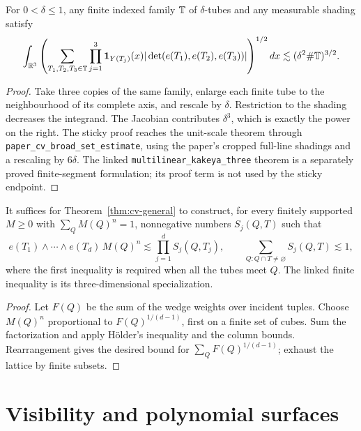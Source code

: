 \begin{theorem}
\label{thm:multilinear-kakeya}
\leanok
{}
For $0<\delta\leq1$, any finite indexed family $\mathbb{T}$ of
$\delta$-tubes and any measurable shading satisfy
\[
 \int_{\mathbb{R}^3}
  \left(\sum_{T_1,T_2,T_3\in\mathbb{T}}
    \prod_{j=1}^3\mathbf{1}_{Y(T_j)}(x)
    |\det(e(T_1),e(T_2),e(T_3))|\right)^{1/2}dx
       \lesssim (\delta^2\#\mathbb{T})^{3/2}.
\]
\end{theorem}
\begin{proof}
\leanok
Take three copies of the same family, enlarge each finite tube to
the neighbourhood of its complete axis, and rescale by $\delta$.
Restriction to the shading decreases the integrand. The Jacobian
contributes $\delta^3$, which is exactly the power on the right.
The sticky proof reaches the unit-scale theorem through
\texttt{paper\_cv\_broad\_set\_estimate}, using the paper's cropped
full-line shadings and a rescaling by $6\delta$. The linked
\texttt{multilinear\_kakeya\_three} theorem is a separately proved
finite-segment formulation; its proof term is not used by the sticky endpoint.
\end{proof}

\begin{proposition}
\label{prop:cv-reduction}
It suffices for Theorem~\ref{thm:cv-general} to construct, for every
finitely supported $M\geq0$ with $\sum_Q M(Q)^n=1$, nonnegative
numbers $S_j(Q,T)$ such that
\[
 e(T_1)\wedge\cdots\wedge e(T_d)\,M(Q)^n
       \lesssim\prod_{j=1}^d S_j(Q,T_j),
 \qquad
 \sum_{Q:Q\cap T\ne\varnothing}S_j(Q,T)\lesssim1,
\]
where the first inequality is required when all the tubes meet $Q$.
The linked finite inequality is its three-dimensional specialization.
\end{proposition}
\begin{proof}
Let $F(Q)$ be the sum of the wedge weights over incident tuples.
Choose $M(Q)^n$ proportional to $F(Q)^{1/(d-1)}$, first on a finite
set of cubes. Sum the factorization and apply H\"older's inequality
and the column bounds. Rearrangement gives the desired bound for
$\sum_Q F(Q)^{1/(d-1)}$; exhaust the lattice by finite subsets.
\end{proof}

\section{Visibility and polynomial surfaces}

